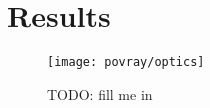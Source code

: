 
\chapter{Results}
\label{cha:results}

\begin{figure}[h]
  \begin{center}
    \texttt{[image: povray/optics]}
  \end{center}
  \caption[An advanced POV-Ray picture]{TODO: fill me in}
  \label{fig:pov-optics}
\end{figure}

